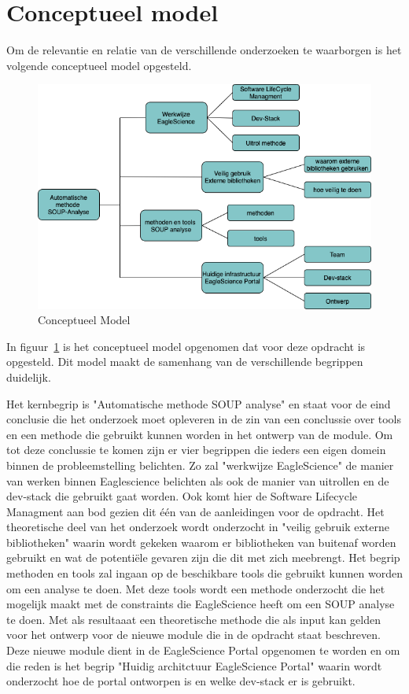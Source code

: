 \newpage %
\section{Conceptueel model}\label{sec:conceptueel-model}
Om de relevantie en relatie van de verschillende onderzoeken te waarborgen is het volgende conceptueel model opgesteld.
\begin{figure}[H]
    \centering
    \includegraphics[width=12cm]{gfx/Conceptueel Model}
    \caption{Conceptueel Model}
    \label{fig:ConceptueelModel}
\end{figure}

In figuur~\ref{fig:ConceptueelModel} is het conceptueel model opgenomen dat voor deze opdracht is opgesteld. Dit model maakt de samenhang van de verschillende begrippen duidelijk.

Het kernbegrip is "Automatische methode SOUP analyse" en staat voor de eind conclusie die het onderzoek moet opleveren in de zin van een conclussie over tools en een methode die gebruikt kunnen worden in het ontwerp van de module. Om tot deze conclussie te komen zijn er vier begrippen die ieders een eigen domein binnen de probleemstelling belichten. Zo zal "werkwijze EagleScience" de manier van werken binnen Eaglescience belichten als ook de manier van uitrollen en de dev-stack die gebruikt gaat worden. Ook komt hier de Software Lifecycle Managment aan bod gezien dit één van de aanleidingen voor de opdracht. Het theoretische deel van het onderzoek wordt onderzocht in "veilig gebruik externe bibliotheken" waarin wordt gekeken waarom er bibliotheken van buitenaf worden gebruikt en wat de potentiële gevaren zijn die dit met zich meebrengt. Het begrip methoden en tools zal ingaan op de beschikbare tools die gebruikt kunnen worden om een analyse te doen. Met deze tools wordt een methode onderzocht die het mogelijk maakt met de constraints die EagleScience heeft om een SOUP analyse te doen. Met als resultaaat een theoretische methode die als input kan gelden voor het ontwerp voor de nieuwe module die in de opdracht staat beschreven. Deze nieuwe module dient in de EagleScience Portal opgenomen te worden en om die reden is het begrip "Huidig architctuur EagleScience Portal" waarin wordt onderzocht hoe de portal ontworpen is en welke dev-stack er is gebruikt.

